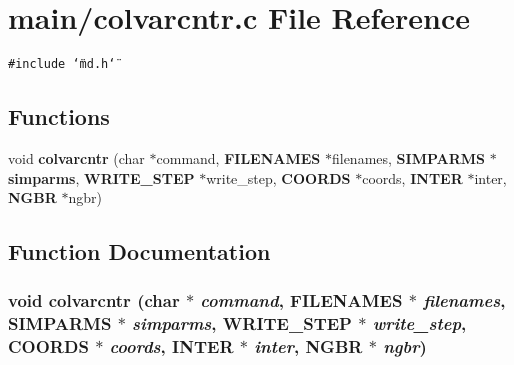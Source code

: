 \section{main/colvarcntr.c File Reference}
\label{colvarcntr_8c}
{\tt \#include \char`\"{}md.h\char`\"{}}\par
\subsection*{Functions}
\begin{CompactItemize}
\item 
void {\bf colvarcntr} (char $\ast$command, {\bf FILENAMES} $\ast$filenames, {\bf SIMPARMS} $\ast${\bf simparms}, {\bf WRITE\_\-STEP} $\ast$write\_\-step, {\bf COORDS} $\ast$coords, {\bf INTER} $\ast$inter, {\bf NGBR} $\ast$ngbr)
\end{CompactItemize}


\subsection{Function Documentation}
\subsubsection{\setlength{\rightskip}{0pt plus 5cm}void colvarcntr (char $\ast$ {\em command}, {\bf FILENAMES} $\ast$ {\em filenames}, {\bf SIMPARMS} $\ast$ {\em simparms}, {\bf WRITE\_\-STEP} $\ast$ {\em write\_\-step}, {\bf COORDS} $\ast$ {\em coords}, {\bf INTER} $\ast$ {\em inter}, {\bf NGBR} $\ast$ {\em ngbr})}\label{colvarcntr_8c_0be3979b7ad7c29d58d1d1e4a65e6c50}


